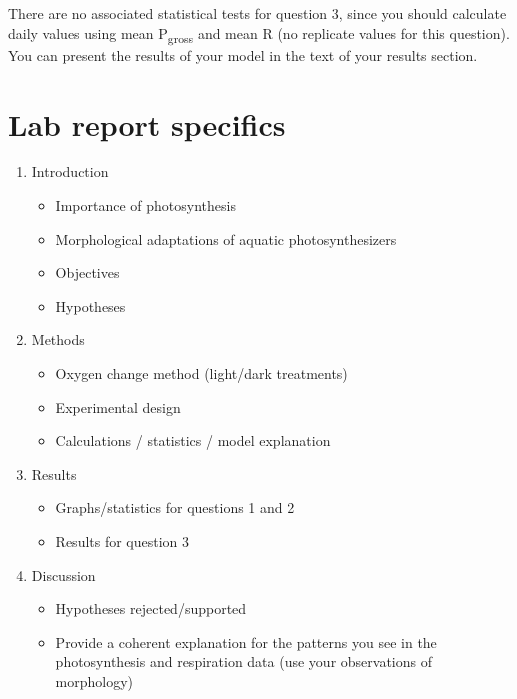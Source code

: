 \documentclass[]{book}
\providecommand{\tightlist}{%
  \setlength{\itemsep}{0pt}\setlength{\parskip}{0pt}}
\theoremstyle{definition}
\theoremstyle{definition}
\theoremstyle{definition}
\theoremstyle{remark}
\begin{document}
There are no associated statistical tests for question 3, since you
should calculate daily values using mean P\textsubscript{gross} and mean
R (no replicate values for this question). You can present the results
of your model in the text of your results section.

\pagebreak

\section{Lab report specifics}\label{lab-report-specifics-1}

\begin{enumerate}
\def\labelenumi{\arabic{enumi}.}
\tightlist
\item
  Introduction

  \begin{itemize}
  \tightlist
  \item
    Importance of photosynthesis
  \item
    Morphological adaptations of aquatic photosynthesizers
  \item
    Objectives
  \item
    Hypotheses
  \end{itemize}
\item
  Methods

  \begin{itemize}
  \tightlist
  \item
    Oxygen change method (light/dark treatments)
  \item
    Experimental design
  \item
    Calculations / statistics / model explanation
  \end{itemize}
\item
  Results

  \begin{itemize}
  \tightlist
  \item
    Graphs/statistics for questions 1 and 2
  \item
    Results for question 3
  \end{itemize}
\item
  Discussion

  \begin{itemize}
  \tightlist
  \item
    Hypotheses rejected/supported
  \item
    Provide a coherent explanation for the patterns you see in the
    photosynthesis and respiration data (use your observations of
    morphology)
  \end{itemize}
\end{enumerate}
\end{document}
